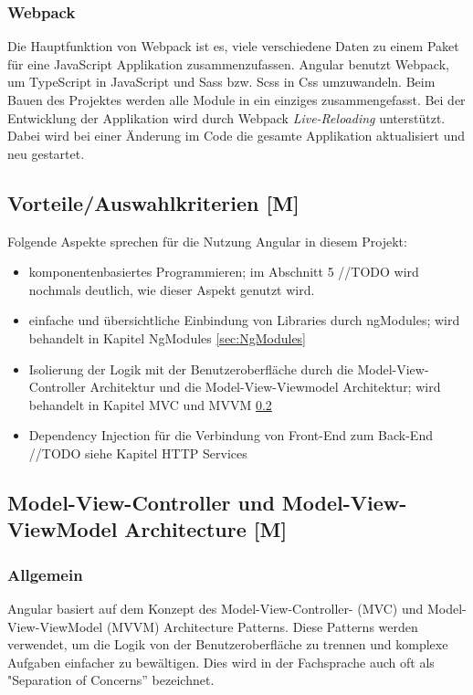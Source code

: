 \cite{ReactiveXIntro}
\subsubsection{Webpack}
Die Hauptfunktion von Webpack ist es, viele verschiedene Daten zu einem Paket für eine JavaScript Applikation zusammenzufassen.
Angular benutzt Webpack, um TypeScript in JavaScript und Sass bzw. Scss in Css umzuwandeln. Beim Bauen des Projektes werden alle Module in ein einziges zusammengefasst. Bei der Entwicklung der Applikation wird durch Webpack \emph{Live-Reloading} unterstützt. Dabei wird bei einer Änderung im Code die gesamte Applikation aktualisiert und neu gestartet.

\subsection{Vorteile/Auswahlkriterien [M]}
Folgende Aspekte sprechen für die Nutzung Angular in diesem Projekt:

\begin{itemize}
  \item komponentenbasiertes Programmieren;
  im Abschnitt 5 //TODO wird nochmals deutlich, wie dieser Aspekt genutzt wird.
  \item einfache und übersichtliche Einbindung von Libraries durch ngModules; wird behandelt in Kapitel NgModules \ref{sec:NgModules} 
  \item Isolierung der Logik mit der Benutzeroberfläche durch die Model-View-Controller Architektur und die Model-View-Viewmodel Architektur; wird behandelt in Kapitel MVC und MVVM \ref{sec:MVCandMVVM} 
  \item 
  Dependency Injection für die Verbindung von Front-End zum Back-End //TODO siehe Kapitel HTTP Services
\end{itemize}

\subsection{Model-View-Controller und Model-View-ViewModel Architecture [M]}\label{sec:MVCandMVVM}
\subsubsection{Allgemein}

Angular basiert auf dem Konzept des Model-View-Controller- (MVC) und Model-View-ViewModel (MVVM) Architecture Patterns. Diese Patterns werden verwendet, um die Logik von der Benutzeroberfläche zu trennen und komplexe Aufgaben einfacher zu bewältigen. Dies wird in der Fachsprache auch oft als "Separation of Concerns” bezeichnet.
\cite{AngularArchitecturePattern}

